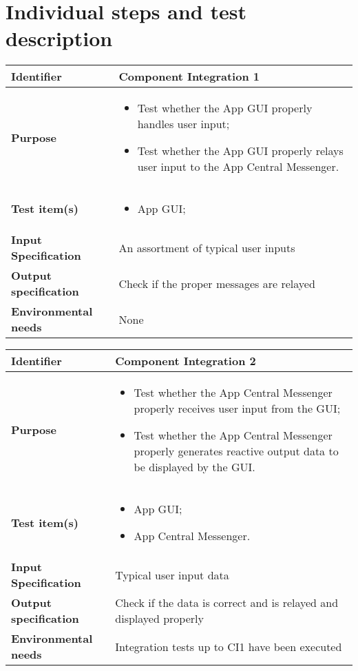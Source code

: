 \chapter{Individual steps and test description}


\begin{center}
\begin{tabular}{lp{}}
\toprule
\textbf{Identifier}		&	Component Integration 1\\
\midrule
\textbf{Purpose}		&	\begin{itemize}
					\item Test whether the App GUI properly handles user input;
					\item Test whether the App GUI properly relays user input to the App Central Messenger.
					\end{itemize}	\\
\textbf{Test item(s)}	&	\begin{itemize}
					\item App GUI;
					\end{itemize}	\\
\textbf{Input Specification}	&	An assortment of typical user inputs\\
\textbf{Output specification}	&	Check if the proper messages are relayed\\
\textbf{Environmental needs}	&	None\\
\bottomrule
\end{tabular}
\end{center}


\begin{center}
\begin{tabular}{lp{}}
\toprule
\textbf{Identifier}		&	Component Integration 2\\
\midrule
\textbf{Purpose}		&	\begin{itemize}
					\item Test whether the App Central Messenger properly receives user input from the GUI;
					\item Test whether the App Central Messenger properly generates reactive output data to be displayed by the GUI.
					\end{itemize}	\\
\textbf{Test item(s)}	&	\begin{itemize}
					\item App GUI;
					\item App Central Messenger.
					\end{itemize}	\\
\textbf{Input Specification}	&	Typical user input data\\
\textbf{Output specification}	&	Check if the data is correct and is relayed and displayed properly\\
\textbf{Environmental needs}	&	Integration tests up to CI1 have been executed\\
\bottomrule
\end{tabular}
\end{center}

